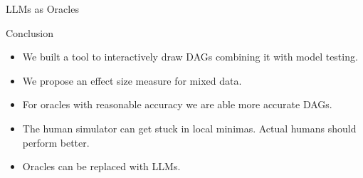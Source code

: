 \documentclass{beamer}
\begin{document}
\begin{frame}{LLMs as Oracles}
\end{frame}

\begin{frame}{Conclusion}
	\begin{itemize}
		\item We built a tool to interactively draw DAGs combining it with model testing.
		\item We propose an effect size measure for mixed data.
		\item For oracles with reasonable accuracy we are able more accurate DAGs.
		\item The human simulator can get stuck in local minimas. Actual humans should perform better.
		\item Oracles can be replaced with LLMs.
	\end{itemize}
\end{frame}
\end{document}
